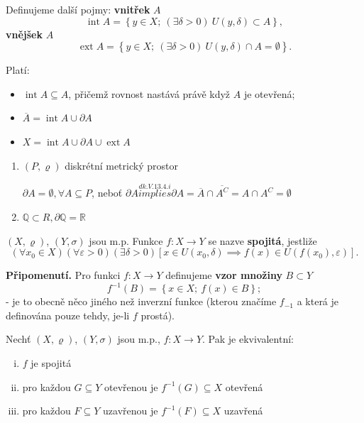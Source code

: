 \begin{poznamka}
Definujeme další pojmy: \textbf{vnitřek} $A$
\[
\operatorname{int} A = \left\{y \in X; \ (\exists \delta > 0) \ U(y, \delta) \subset A \right\},
\]
\textbf{vnějšek} $A$
\[
\operatorname{ext} A = \left\{y \in X; \ (\exists \delta > 0) \ U(y, \delta) \cap A = \emptyset \right\}.
\]

Platí:
\begin{itemize}
    \item $\operatorname{int} A \subseteq A$, přičemž rovnost nastává právě když $A$ je otevřená;
    \item $\overline{A} = \operatorname{int} A \cup \partial A$
    \item $X = \operatorname{int} A \cup \partial A \cup \operatorname{ext} A$
\end{itemize}
\end{poznamka}

\begin{priklad}
  \begin{enumerate}[1.]
    \item $(P, \varrho)$ diskrétní metrický prostor

    $\partial A = \emptyset, \forall A  \subseteq P$, neboť $\partial A \stackrel{dk. V. 13. 4. i}{implies} \partial A = \overline{A} \cap \overline{A^C}= A\cap A^C = \emptyset$
    \item $\mathbb Q \subset R, \partial \mathbb Q = \mathbb R$
  \end{enumerate}
\end{priklad}

\begin{definice}
$(X, \varrho)$, $(Y, \sigma)$ jsou m.p. Funkce $f: X \to Y$ se nazve \textbf{spojitá}, jestliže
\[
\left(\forall x_0 \in X\right) \left(\forall \varepsilon > 0\right) \left(\exists \delta > 0\right) \left[ x \in U(x_0, \delta) \implies f(x) \in U(f(x_0), \varepsilon) \right].
\]
\end{definice}

\textbf{Připomenutí.} Pro funkci $f: X \to Y$ definujeme \textbf{vzor množiny} $B \subset Y$
\[
f^{-1}(B) = \left\{x \in X; \ f(x) \in B \right\};
\]
- je to obecně něco jiného než inverzní funkce (kterou značíme $f_{-1}$ a která je definována pouze tehdy, je-li $f$ prostá).

\begin{veta}
Nechť $(X, \varrho)$, $(Y, \sigma)$ jsou m.p., $f: X \to Y$. Pak je ekvivalentní:

\begin{enumerate}[i.]
    \item $f$ je spojitá
    \item pro každou $G \subseteq Y$ otevřenou je $f^{-1}(G) \subseteq X$ otevřená
    \item pro každou $F \subseteq Y$ uzavřenou je $f^{-1}(F) \subseteq X$ uzavřená
\end{enumerate}
\end{veta}

